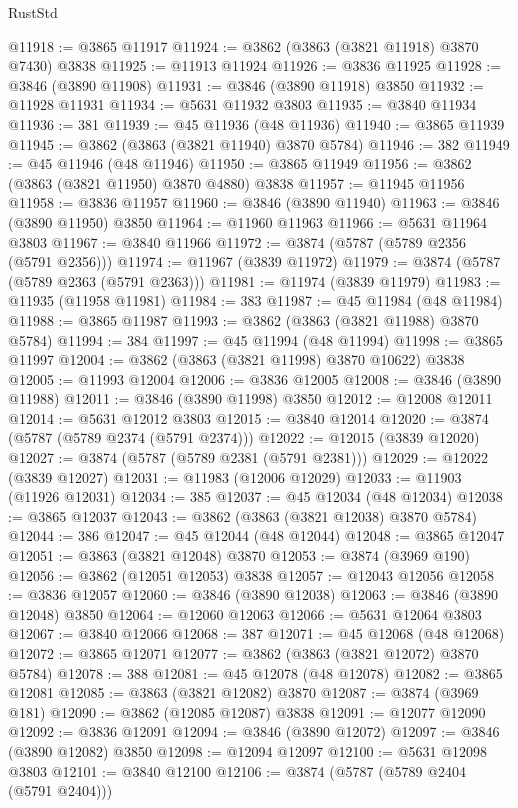 \begin{lexlean}{RustStd}
\begin{coremodule}
@11918 := @3865 @11917
@11924 := @3862 (@3863 (@3821 @11918) @3870 @7430) @3838
@11925 := @11913 @11924
@11926 := @3836 @11925
@11928 := @3846 (@3890 @11908)
@11931 := @3846 (@3890 @11918) @3850
@11932 := @11928 @11931
@11934 := @5631 @11932 @3803
@11935 := @3840 @11934
@11936 := 381
@11939 := @45 @11936 (@48 @11936)
@11940 := @3865 @11939
@11945 := @3862 (@3863 (@3821 @11940) @3870 @5784)
@11946 := 382
@11949 := @45 @11946 (@48 @11946)
@11950 := @3865 @11949
@11956 := @3862 (@3863 (@3821 @11950) @3870 @4880) @3838
@11957 := @11945 @11956
@11958 := @3836 @11957
@11960 := @3846 (@3890 @11940)
@11963 := @3846 (@3890 @11950) @3850
@11964 := @11960 @11963
@11966 := @5631 @11964 @3803
@11967 := @3840 @11966
@11972 := @3874 (@5787 (@5789 @2356 (@5791 @2356)))
@11974 := @11967 (@3839 @11972)
@11979 := @3874 (@5787 (@5789 @2363 (@5791 @2363)))
@11981 := @11974 (@3839 @11979)
@11983 := @11935 (@11958 @11981)
@11984 := 383
@11987 := @45 @11984 (@48 @11984)
@11988 := @3865 @11987
@11993 := @3862 (@3863 (@3821 @11988) @3870 @5784)
@11994 := 384
@11997 := @45 @11994 (@48 @11994)
@11998 := @3865 @11997
@12004 := @3862 (@3863 (@3821 @11998) @3870 @10622) @3838
@12005 := @11993 @12004
@12006 := @3836 @12005
@12008 := @3846 (@3890 @11988)
@12011 := @3846 (@3890 @11998) @3850
@12012 := @12008 @12011
@12014 := @5631 @12012 @3803
@12015 := @3840 @12014
@12020 := @3874 (@5787 (@5789 @2374 (@5791 @2374)))
@12022 := @12015 (@3839 @12020)
@12027 := @3874 (@5787 (@5789 @2381 (@5791 @2381)))
@12029 := @12022 (@3839 @12027)
@12031 := @11983 (@12006 @12029)
@12033 := @11903 (@11926 @12031)
@12034 := 385
@12037 := @45 @12034 (@48 @12034)
@12038 := @3865 @12037
@12043 := @3862 (@3863 (@3821 @12038) @3870 @5784)
@12044 := 386
@12047 := @45 @12044 (@48 @12044)
@12048 := @3865 @12047
@12051 := @3863 (@3821 @12048) @3870
@12053 := @3874 (@3969 @190)
@12056 := @3862 (@12051 @12053) @3838
@12057 := @12043 @12056
@12058 := @3836 @12057
@12060 := @3846 (@3890 @12038)
@12063 := @3846 (@3890 @12048) @3850
@12064 := @12060 @12063
@12066 := @5631 @12064 @3803
@12067 := @3840 @12066
@12068 := 387
@12071 := @45 @12068 (@48 @12068)
@12072 := @3865 @12071
@12077 := @3862 (@3863 (@3821 @12072) @3870 @5784)
@12078 := 388
@12081 := @45 @12078 (@48 @12078)
@12082 := @3865 @12081
@12085 := @3863 (@3821 @12082) @3870
@12087 := @3874 (@3969 @181)
@12090 := @3862 (@12085 @12087) @3838
@12091 := @12077 @12090
@12092 := @3836 @12091
@12094 := @3846 (@3890 @12072)
@12097 := @3846 (@3890 @12082) @3850
@12098 := @12094 @12097
@12100 := @5631 @12098 @3803
@12101 := @3840 @12100
@12106 := @3874 (@5787 (@5789 @2404 (@5791 @2404)))

\end{coremodule}
\end{lexlean}
